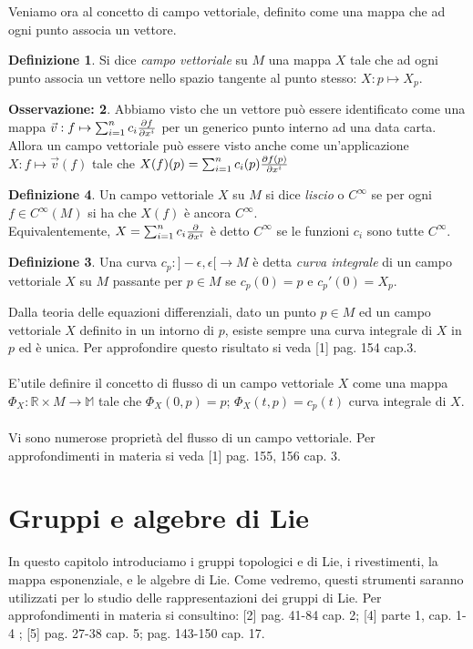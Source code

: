 \documentclass[12pt,a4paper]{report}
\theoremstyle{definition}
\newtheorem{Def}{Definizione}[chapter]
\theoremstyle{Theorem}
\theoremstyle{definition}
\theoremstyle{definition}
\theoremstyle{definition}
\newtheorem{Obs}[Def]{Osservazione:}
\begin{document}
Veniamo ora al concetto di campo vettoriale, definito come una mappa che ad ogni punto associa un vettore.
\begin{Def}
	Si dice \textit{campo vettoriale} su $M$ una mappa $X$ tale che ad ogni punto associa un vettore nello spazio tangente al punto stesso: $X:p\mapsto X_p$. 
\end{Def}
\begin{Obs}
	Abbiamo visto che un vettore può essere identificato come una mappa $\vec{v}:f\mapsto\sum_{i=1}^{n}c_i{\partial f\over \partial x^i}$ per un generico punto interno ad una data carta. Allora un campo vettoriale può essere visto anche come un'applicazione $X:f\mapsto\vec{v}(f)$ tale che $X(f)(p)=\sum_{i=1}^{n}c_i(p){\partial f(p)\over \partial x^i}$
\end{Obs}
\begin{Def}
	Un campo vettoriale $X$ su $M$ si dice \textit{liscio} o $C^\infty$ se per ogni $f\in C^\infty(M)$ si ha che $X(f)$ è ancora $C^\infty$.
\\
Equivalentemente, $X=\sum_{i=1}^{n}c_i{\partial\over \partial x^i}$ è detto $C^\infty$ se le funzioni $c_i$ sono tutte $C^\infty$.
\begin{Def}
	Una curva $c_p:]-\epsilon,\epsilon[\rightarrow M$ è detta \textit{curva integrale} di un campo vettoriale $X$ su $M$ passante per $p\in M$ se $c_p(0)=p$ e $c_p'(0)=X_p$.
\end{Def}
Dalla teoria delle equazioni differenziali, dato un punto $p\in M$ ed un campo vettoriale $X$ definito in un intorno di $p$, esiste sempre una curva integrale di $X$ in $p$ ed è unica. Per approfondire questo risultato si veda [1] pag. 154 cap.3.\\
\\
E'utile definire il concetto di flusso di un campo vettoriale $X$ come una mappa $\Phi_X:\mathbb{R}\times M\rightarrow\mathbb{M}$ tale che $\Phi_X(0,p)=p$; $\Phi_X(t,p)=c_p(t)$ curva integrale di $X$.\\
\\
Vi sono numerose proprietà del flusso di un campo vettoriale. Per approfondimenti in materia si veda [1] pag. 155, 156 cap. 3.
\end{Def}
\chapter{Gruppi e algebre di Lie} \label{Chap: 2}
In questo capitolo introduciamo i gruppi topologici e di Lie, i rivestimenti, la mappa esponenziale, e le algebre di Lie. Come vedremo, questi strumenti saranno utilizzati per lo studio delle rappresentazioni dei gruppi di Lie. Per approfondimenti in materia si consultino: [2] pag. 41-84 cap. 2; [4] parte 1, cap. 1-4 ; [5] pag. 27-38 cap. 5; pag. 143-150 cap. 17.
\end{document}
